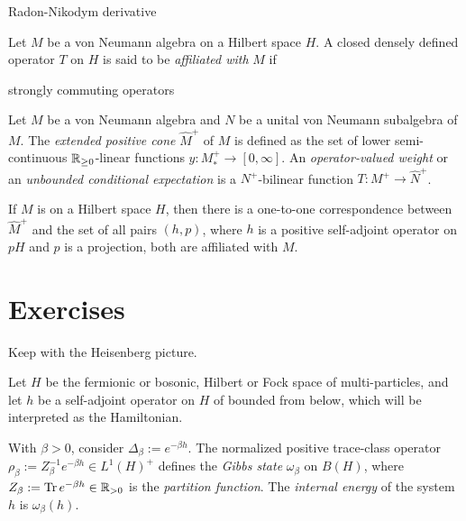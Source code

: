 \documentclass{../../large}
\begin{document}
\begin{prb}
Radon-Nikodym derivative
\end{prb}



\begin{prb}
\end{prb}


\begin{prb}
Let $M$ be a von Neumann algebra on a Hilbert space $H$.
A closed densely defined operator $T$ on $H$ is said to be \emph{affiliated with} $M$ if 


strongly commuting operators

\end{prb}




\begin{prb}
Let $M$ be a von Neumann algebra and $N$ be a unital von Neumann subalgebra of $M$.
The \emph{extended positive cone} $\hat M^+$ of $M$ is defined as the set of lower semi-continuous $\mathbb{R}_{\ge0}$-linear functions $y:M_*^+\to[0,\infty]$.
An \emph{operator-valued weight} or an \emph{unbounded conditional expectation} is a $N^+$-bilinear function $T:M^+\to\hat N^+$.


\begin{parts}
\item If $M$ is on a Hilbert space $H$, then there is a one-to-one correspondence between $\hat M^+$ and the set of all pairs $(h,p)$, where $h$ is a positive self-adjoint operator on $pH$ and $p$ is a projection, both are affiliated with $M$.
\end{parts}
\end{prb}



\section*{Exercises}





Keep with the Heisenberg picture.

Let $H$ be the fermionic or bosonic, Hilbert or Fock space of multi-particles, and let $h$ be a self-adjoint operator on $H$ of bounded from below, which will be interpreted as the Hamiltonian.

With $\beta>0$, consider $\Delta_\beta:=e^{-\beta h}$.
The normalized positive trace-class operator $\rho_\beta:=Z_\beta^{-1}e^{-\beta h}\in L^1(H)^+$ defines the \emph{Gibbs state} $\omega_\beta$ on $B(H)$, where $Z_\beta:=\operatorname{Tr} e^{-\beta h}\in\mathbb{R}_{>0}$ is the \emph{partition function}.
The \emph{internal energy} of the system $h$ is $\omega_\beta(h)$.
\end{document}

